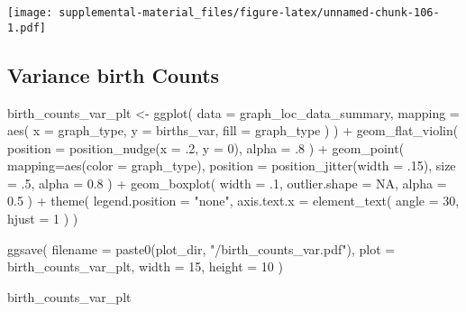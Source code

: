 \documentclass[
]{book}
\newenvironment{Shaded}{\begin{snugshade}}{\end{snugshade}}
\newcommand{\AttributeTok}[1]{\textcolor[rgb]{0.77,0.63,0.00}{#1}}
\newcommand{\ConstantTok}[1]{\textcolor[rgb]{0.00,0.00,0.00}{#1}}
\newcommand{\DecValTok}[1]{\textcolor[rgb]{0.00,0.00,0.81}{#1}}
\newcommand{\FloatTok}[1]{\textcolor[rgb]{0.00,0.00,0.81}{#1}}
\newcommand{\FunctionTok}[1]{\textcolor[rgb]{0.00,0.00,0.00}{#1}}
\newcommand{\NormalTok}[1]{#1}
\newcommand{\OtherTok}[1]{\textcolor[rgb]{0.56,0.35,0.01}{#1}}
\newcommand{\SpecialCharTok}[1]{\textcolor[rgb]{0.00,0.00,0.00}{#1}}
\newcommand{\StringTok}[1]{\textcolor[rgb]{0.31,0.60,0.02}{#1}}
\begin{document}
\texttt{[image: supplemental-material\_files/figure-latex/unnamed-chunk-106-1.pdf]}

\hypertarget{variance-birth-counts-1}{%
\subsection{Variance birth Counts}\label{variance-birth-counts-1}}

\begin{Shaded}
\begin{Highlighting}[]
\NormalTok{birth\_counts\_var\_plt }\OtherTok{\textless{}{-}} \FunctionTok{ggplot}\NormalTok{(}
    \AttributeTok{data =}\NormalTok{ graph\_loc\_data\_summary,}
    \AttributeTok{mapping =} \FunctionTok{aes}\NormalTok{(}
      \AttributeTok{x =}\NormalTok{ graph\_type,}
      \AttributeTok{y =}\NormalTok{ births\_var,}
      \AttributeTok{fill =}\NormalTok{ graph\_type}
\NormalTok{    )}
\NormalTok{  ) }\SpecialCharTok{+}
  \FunctionTok{geom\_flat\_violin}\NormalTok{(}
    \AttributeTok{position =} \FunctionTok{position\_nudge}\NormalTok{(}\AttributeTok{x =}\NormalTok{ .}\DecValTok{2}\NormalTok{, }\AttributeTok{y =} \DecValTok{0}\NormalTok{),}
    \AttributeTok{alpha =}\NormalTok{ .}\DecValTok{8}
\NormalTok{  ) }\SpecialCharTok{+}
  \FunctionTok{geom\_point}\NormalTok{(}
    \AttributeTok{mapping=}\FunctionTok{aes}\NormalTok{(}\AttributeTok{color =}\NormalTok{ graph\_type),}
    \AttributeTok{position =} \FunctionTok{position\_jitter}\NormalTok{(}\AttributeTok{width =}\NormalTok{ .}\DecValTok{15}\NormalTok{),}
    \AttributeTok{size =}\NormalTok{ .}\DecValTok{5}\NormalTok{,}
    \AttributeTok{alpha =} \FloatTok{0.8}
\NormalTok{  ) }\SpecialCharTok{+}
  \FunctionTok{geom\_boxplot}\NormalTok{(}
    \AttributeTok{width =}\NormalTok{ .}\DecValTok{1}\NormalTok{,}
    \AttributeTok{outlier.shape =} \ConstantTok{NA}\NormalTok{,}
    \AttributeTok{alpha =} \FloatTok{0.5}
\NormalTok{  ) }\SpecialCharTok{+}
  \FunctionTok{theme}\NormalTok{(}
    \AttributeTok{legend.position =} \StringTok{"none"}\NormalTok{,}
    \AttributeTok{axis.text.x =} \FunctionTok{element\_text}\NormalTok{(}
      \AttributeTok{angle =} \DecValTok{30}\NormalTok{,}
      \AttributeTok{hjust =} \DecValTok{1}
\NormalTok{    )}
\NormalTok{  )}

\FunctionTok{ggsave}\NormalTok{(}
  \AttributeTok{filename =} \FunctionTok{paste0}\NormalTok{(plot\_dir, }\StringTok{"/birth\_counts\_var.pdf"}\NormalTok{),}
  \AttributeTok{plot =}\NormalTok{ birth\_counts\_var\_plt,}
  \AttributeTok{width =} \DecValTok{15}\NormalTok{,}
  \AttributeTok{height =} \DecValTok{10}
\NormalTok{)}

\NormalTok{birth\_counts\_var\_plt}
\end{Highlighting}
\end{Shaded}
\end{document}
